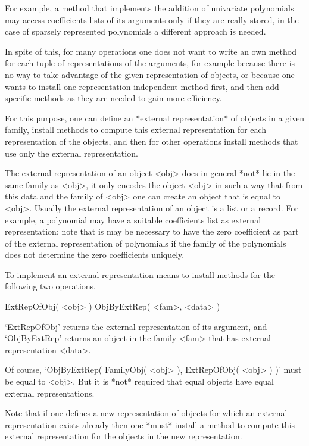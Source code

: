 For example, a method that implements the addition of univariate
polynomials may access coefficients lists of its arguments
only if they are really stored, 
in the case of sparsely represented polynomials a different approach is
needed.

In spite of this, for many operations one does not want to write an own
method for each tuple of representations of the arguments,
for example because there is no way to take advantage of the given
representation of objects,
or because one wants to install one representation independent method
first, and then add specific methods as they are needed to gain more
efficiency.

For this purpose,
one can define an *external representation* of objects in a given family,
install methods to compute this external representation for each
representation of the objects,
and then for other operations install methods that use only the external
representation.

The external representation of an object <obj> does in general *not* lie
in the same family as <obj>,
it only encodes the object <obj> in such a way that from this data and
the family of <obj> one can create an object that is equal to <obj>.
Usually the external representation of an object is a list or a record.
For example, a polynomial may have a suitable coefficients list as
external representation;
note that is may be necessary to have the zero coefficient as part of
the external representation of polynomials if the family of the
polynomials does not determine the zero coefficients uniquely.

To implement an external representation means to install methods for the
following two operations.

\>ExtRepOfObj( <obj> )
\>ObjByExtRep( <fam>, <data> )

`ExtRepOfObj' returns the external representation of its argument,
and `ObjByExtRep' returns an object in the family <fam> that has
external representation <data>.

Of course, `ObjByExtRep( FamilyObj( <obj> ), ExtRepOfObj( <obj> ) )'
must be equal to <obj>.
But it is *not* required that equal objects have equal external
representations.

Note that if one defines a new representation of objects for which an
external representation exists already
then one *must* install a method to compute this external representation
for the objects in the new representation.



